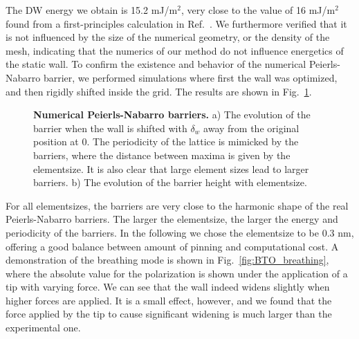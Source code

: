 The DW energy we obtain is 15.2 mJ/m$^2$, very close to the value of 16 mJ/m$^2$ found from a first-principles calculation in Ref.~\cite{Padilla1996}.
We furthermore verified that it is not influenced by the size of the numerical geometry, or the density of the mesh, indicating that the numerics of our method do not influence energetics of the static wall.
To confirm the existence and behavior of the numerical Peierls-Nabarro barrier, we performed simulations where first the wall was optimized, and then rigidly shifted inside the grid.
The results are shown in Fig.~\ref{fig:BTO_peierls_nabarro}.
\begin{figure}[h!]
	\caption{\label{fig:BTO_peierls_nabarro}{\bf Numerical Peierls-Nabarro barriers.} a) The evolution of the barrier when the wall is shifted with $\delta_w$ away from the original position at 0. The periodicity of the lattice is mimicked by the barriers, where the distance between maxima is given by the elementsize. It is also clear that large element sizes lead to larger barriers. b) The evolution of the barrier height with elementsize.}
\end{figure}
For all elementsizes, the barriers are very close to the harmonic shape of the real Peierls-Nabarro barriers. The larger the elementsize, the larger the energy and periodicity of the barriers.
In the following we chose the elementsize to be 0.3 nm, offering a good balance between amount of pinning and computational cost. 
A demonstration of the breathing mode is shown in Fig.~\ref{fig:BTO_breathing}, where the absolute value for the polarization is shown under the application of a tip with varying force.
We can see that the wall indeed widens slightly when higher forces are applied. It is a small effect, however, and we found that the force applied by the tip to cause significant widening is much larger than the experimental one.

